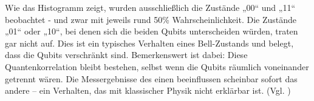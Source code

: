 Wie das Histogramm zeigt, wurden ausschließlich die Zustände „00“ und „11“ beobachtet - und zwar mit jeweils rund 50\% Wahrscheinlichkeit. Die Zustände „01“ oder „10“, bei denen sich die beiden Qubits unterscheiden würden, traten gar nicht auf. Dies ist ein typisches Verhalten eines Bell-Zustands und belegt, dass die Qubits verschränkt sind. Bemerkenswert ist dabei: Diese Quantenkorrelation bleibt bestehen, selbst wenn die Qubits räumlich voneinander getrennt wären. Die Messergebnisse des einen beeinflussen scheinbar sofort das andere – ein Verhalten, das mit klassischer Physik nicht erklärbar ist. (Vgl. \cite{Bell State ZZ-Measurement}) 


\printbibliography
